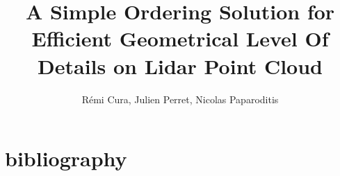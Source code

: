 
	

\title{ A Simple Ordering Solution for Efficient Geometrical Level Of Details on Lidar Point Cloud}
\author{Rémi Cura, Julien Perret, Nicolas Paparoditis}



\maketitle
\newpage
 


	

	

	
	
	

	

	

%	

	\section{bibliography}
%	



%	
%		
%
%	 	
%		





